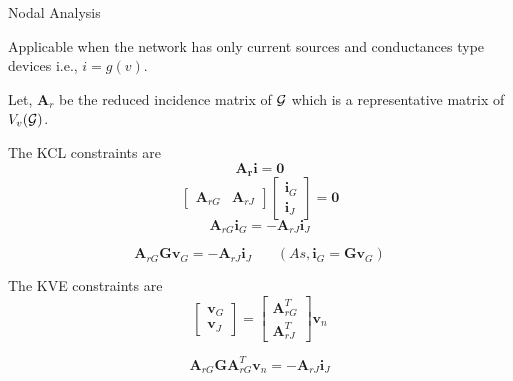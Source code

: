 \documentclass{beamer}
\begin{document}
\begin{frame}
\begin{block}{\small Nodal Analysis}
\begin{itemize}
\begin{small}
\item Applicable when the network has only current sources and conductances type devices i.e., $i=g(v)$.
\item Let, $\mathbf{A}_r$ be the reduced incidence matrix of $\cal{G}$ which is a representative matrix of $V_v(\cal{G})$. \\
\end{small}
\begin{tiny}
The KCL constraints are
$$\mathbf{A_ri}=\mathbf{0}$$
$$\left[\begin{array}{cc}
  \mathbf{A}_{rG} & \mathbf{A}_{rJ}
\end{array}\right]
\left[\begin{array}{c}
  \mathbf{i}_{G} \\
  \mathbf{i}_{J}
\end{array}\right]
=\mathbf{0}$$
$$\mathbf{A}_{rG}\mathbf{i}_{G}=-\mathbf{A}_{rJ}\mathbf{i}_{J}$$

$$\mathbf{A}_{rG}\mathbf{G}\mathbf{v}_{G}=-\mathbf{A}_{rJ}\mathbf{i}_{J}\ \ \ \ \ \ \ \ (As, \mathbf{i}_{G}=\mathbf{G}\mathbf{v}_{G})$$

The KVE constraints are
$$\left[\begin{array}{c}
  \mathbf{v}_{G} \\
  \mathbf{v}_{J}
\end{array}\right]
=
\left[\begin{array}{c}
  \mathbf{A}_{rG}^T \\
  \mathbf{A}_{rJ}^T
\end{array}\right]
\mathbf{v}_n$$

\begin{equation}
\mathbf{A}_{rG}\mathbf{G}\mathbf{A}_{rG}^{T}\mathbf{v}_{n}=-\mathbf{A}_{rJ}\mathbf{i}_{J}
\label{nodal_equation}
\end{equation}
\end{tiny}
\end{itemize}
\end{block}
\end{frame}
\end{document}
